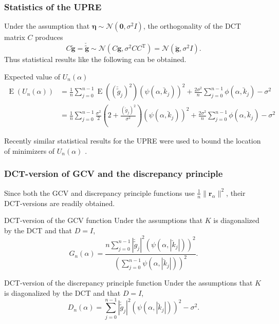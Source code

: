 \documentclass[t]{beamer}
\newcommand{\noise}{\eta}	%
\newcommand{\noiseSD}{\sigma}	%
\DeclareMathOperator{\E}{E}	%
\newcommand{\gVec}{\mathbf{g}}	%
\newcommand{\gnoise}{\widetilde{g}}	%
\newcommand{\gnoiseVec}{\widetilde{\mathbf{g}}}	%
\newcommand{\trans}{\mathrm{T}}	%
\newcommand{\noiseVec}{\mathbf{\noise}}	%
\newcommand{\dct}[1]{\breve{#1}}	%
\newcommand{\regparam}{\alpha}
\newcommand{\filt}{\phi}
\newcommand{\mfilt}{\psi}
\newcommand{\regres}{\mathbf{r}_{\regparam}}	%
\newcommand{\U}{U}	%
\newcommand{\GCV}{G}	%
\newcommand{\D}{D}	%
\begin{document}
\begin{frame}
\frametitle{Statistics of the UPRE}
Under the assumption that $\mathbf{\noiseVec} \sim \mathcal{N}(\mathbf{0},\noiseSD^2 I)$, the orthogonality of the DCT matrix $C$ produces
\[C\mathbf{\gnoiseVec} = \dct{\mathbf{\gnoiseVec}} \sim \mathcal{N}(C\mathbf{\gVec},\noiseSD^2 CC^\trans) = \mathcal{N}(\dct{\mathbf{\gVec}},\noiseSD^2 I).\]
Thus statistical results like the following can be obtained.
\begin{block}{Expected value of $\U_n(\regparam)$}
\begin{align*}
\E\left(\U_n(\regparam)\right) &= \frac{1}{n}\sum_{j = 0}^{n-1} \E\left((\dct{\gnoise}_j)^2\right)(\mfilt(\regparam,\dct{k}_j))^2 + \frac{2\noiseSD^2}{n}\sum_{j = 0}^{n-1} \filt(\regparam,\dct{k}_j) - \noiseSD^2 \\
&= \frac{1}{n}\sum_{j = 0}^{n-1} \frac{\noiseSD^2}{2}\left(2 + \frac{(\dct{g}_j)^2}{\noiseSD^2}\right)(\mfilt(\regparam,\dct{k}_j))^2 + \frac{2\noiseSD^2}{n}\sum_{j = 0}^{n-1} \filt(\regparam,\dct{k}_j) - \noiseSD^2
\end{align*}
\end{block}
Recently similar statistical results for the UPRE were used to bound the location of minimizers of $\U_n(\regparam)$ \cite{RenautHelmstetterVatankhah}.
\end{frame}

\begin{frame}
\frametitle{DCT-version of GCV and the discrepancy principle}
Since both the GCV and discrepancy principle functions use $\frac{1}{n}\|\regres\|^2$, their DCT-versions are readily obtained.
\begin{block}{DCT-version of the GCV function}
Under the assumptions that $K$ is diagonalized by the DCT and that $D = I$,
\[\GCV_n(\regparam) = \frac{n \sum_{j = 0}^{n-1} |\dct{\gnoise}_j|^2(\mfilt(\regparam,|\dct{k}_j|))^2}{(\sum_{j = 0}^{n-1} \mfilt(\regparam,|\dct{k}_j|))^2}.\]
\end{block}
\begin{block}{DCT-version of the discrepancy principle function}
Under the assumptions that $K$ is diagonalized by the DCT and that $D = I$,
\[\D_n(\regparam) = \sum_{j = 0}^{n-1} |\dct{\gnoise}_j|^2(\mfilt(\regparam,|\dct{k}_j|))^2 - \noiseSD^2.\]
\end{block}
\end{frame}
\end{document}
